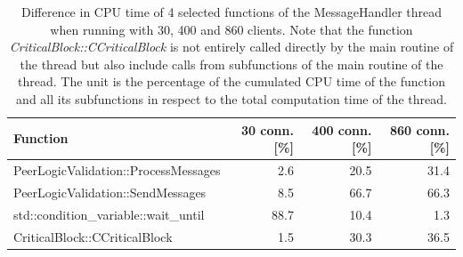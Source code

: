 
\begin{table}[htbp]
\begin{center}
\begin{minipage}{\textwidth}
\begin{center}
\begin{tabular}{l|r|r|r}
\textbf{Function} & \textbf{30 conn. [\%]} & \textbf{400 conn. [\%]} & \textbf{860 conn. [\%]} \\
\hline
\small PeerLogicValidation::ProcessMessages 	& 2.6  & 20.5  	& 31.4\\
\small PeerLogicValidation::SendMessages 		& 8.5  & 66.7	& 66.3 \\
\small std::condition\_variable::wait\_until 	& 88.7 & 10.4	& 1.3 \\
\hline
\small CriticalBlock::CCriticalBlock 			& 1.5 & 30.3 	& 36.5 \\
\end{tabular}
\end{center}
\end{minipage}
\end{center}
\caption[Difference in CPU time of 4 selected functions of the MessageHandler thread.]{Difference in CPU time of 4 selected functions of the MessageHandler thread when running with 30, 400 and 860 clients. Note that the function \textit{CriticalBlock::CCriticalBlock} is not entirely called directly by the main routine of the thread but also include calls from subfunctions of the main routine of the thread. The unit is the percentage of the cumulated CPU time of the function and all its subfunctions in respect to the total computation time of the thread.}
\label{tab:task_mix_message}
\end{table}


